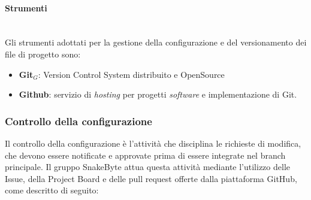 \documentclass[10pt, letterpaper]{article}
\newcommand{\trisubsection}[1]{\paragraph{#1}\mbox{}\\}
\begin{document}
\trisubsection{Strumenti}
Gli strumenti adottati per la gestione della configurazione e del versionamento dei file di progetto sono:
\begin{itemize}
    \item \textbf{Git}$_{G}$: Version Control System distribuito e OpenSource
    \item \textbf{Github}: servizio di \textit{hosting} per progetti \textit{software} e implementazione di Git.
\end{itemize}

\subsubsection{Controllo della configurazione}
Il controllo della configurazione è l'attività che disciplina le richieste 
di modifica, che devono essere notificate e approvate prima di essere 
integrate nel branch principale. Il gruppo SnakeByte attua questa attività 
mediante l'utilizzo delle Issue, della Project Board e delle pull request 
offerte dalla piattaforma GitHub, come descritto di seguito:
\end{document}
